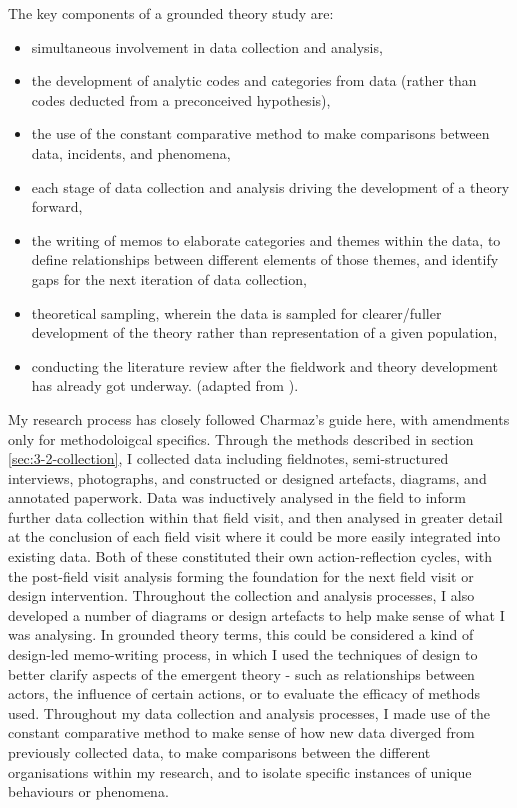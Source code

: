 The key components of a grounded theory study are:
\begin{itemize}
    \item simultaneous involvement in data collection and analysis,
    \item the development of analytic codes and categories from data (rather than codes deducted from a preconceived hypothesis),
    \item the use of the constant comparative method to make comparisons between data, incidents, and phenomena,
    \item each stage of data collection and analysis driving the development of a theory forward,
    \item the writing of memos to elaborate categories and themes within the data, to define relationships between different elements of those themes, and identify gaps for the next iteration of data collection,
    \item theoretical sampling, wherein the data is sampled for clearer/fuller development of the theory rather than representation of a given population,
    \item conducting the literature review after the fieldwork and theory development has already got underway. (adapted from \cite[5-6]{charmaz_constructing_2006}).
\end{itemize}
 
My research process has closely followed Charmaz's guide here, with amendments only for methodoloigcal specifics. Through the methods described in section \ref{sec:3-2-collection}, I collected data including fieldnotes, semi-structured interviews, photographs, and constructed or designed artefacts, diagrams, and annotated paperwork. Data was inductively analysed in the field to inform further data collection within that field visit, and then analysed in greater detail at the conclusion of each field visit where it could be more easily integrated into existing data. Both of these constituted their own action-reflection cycles, with the post-field visit analysis forming the foundation for the next field visit or design intervention. Throughout the collection and analysis processes, I also developed a number of diagrams or design artefacts to help make sense of what I was analysing. In grounded theory terms, this could be considered a kind of design-led memo-writing process, in which I used the techniques of design to better clarify aspects of the emergent theory - such as relationships between actors, the influence of certain actions, or to evaluate the efficacy of methods used. Throughout my data collection and analysis processes, I made use of the constant comparative method to make sense of how new data diverged from previously collected data, to make comparisons between the different organisations within my research, and to isolate specific instances of unique behaviours or phenomena.

